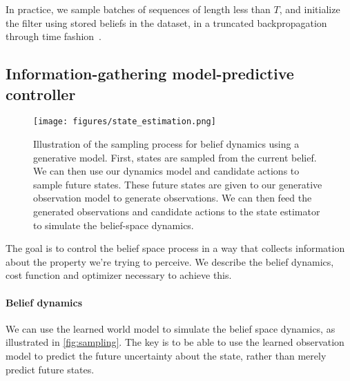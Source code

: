 \documentclass[anon]{l4dc2024}
\begin{document}
In practice, we sample batches of sequences of length less than $T$, and initialize the filter using stored beliefs in the dataset, in a truncated backpropagation through time fashion~\citep{tbptt}.

\subsection{Information-gathering model-predictive controller}
\label{sec:control}

\begin{figure}
    \centering
    \texttt{[image: figures/state\_estimation.png]}
    \caption{Illustration of the sampling process for belief dynamics using a generative model.
        First, states are sampled from the current belief.
        We can then use our dynamics model and candidate actions to sample future states.
        These future states are given to our generative observation model to generate observations.
        We can then feed the generated observations and candidate actions to the state estimator to simulate the belief-space dynamics.}
    \label{fig:sampling}
\end{figure}


The goal is to control the belief space process in a way that collects information about the property we're trying to perceive.
We describe the belief dynamics, cost function and optimizer necessary to achieve this.

\paragraph{Belief dynamics}
We can use the learned world model to simulate the belief space dynamics, as illustrated in \autoref{fig:sampling}.
The key is to be able to use the learned observation model to predict the future uncertainty about the state, rather than merely predict future states.
\end{document}
